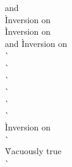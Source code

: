 \begin{description}
\begin{tabbing}
     and  \\
      \` Inversion on  \\
      \` Inversion on  \\
     and 
      \` Inversion on  \\
      \`  \\
      \`  \\
      \`  \- \\
    \`  \\
    \`  \\
    \`  \\
    \` Inversion on  \\
    \`  \\
    \` Vacuously true \\
    \`  \\

  \end{tabbing}


\end{description}
